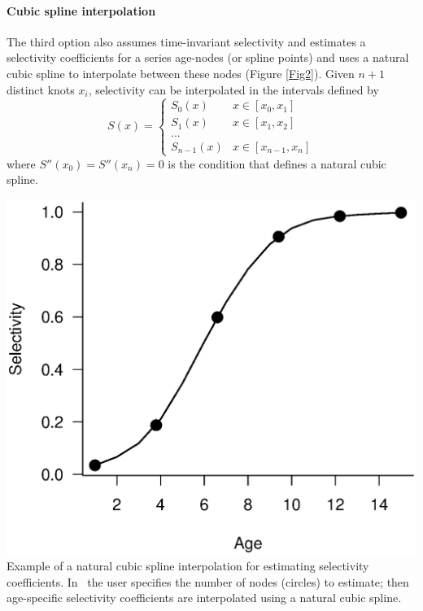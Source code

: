 \begin{multicols}{2}
\paragraph{Cubic spline interpolation}
The third option also assumes time-invariant selectivity and estimates a selectivity coefficients for a series age-nodes (or spline points) and uses a natural cubic spline to interpolate between these nodes (Figure \ref{Fig2}). Given $n+1$ distinct knots $x_i$, selectivity can be interpolated in the intervals defined by
\[
S(x) = \begin{cases}
    S_0(x) & x \in [x_0,x_1]\\
    S_1(x) & x \in [x_1,x_2]\\
    ...\\
    S_{n-1}(x) & x \in [x_{n-1},x_n]
\end{cases}
\]
where  $S''(x_0) = S''(x_n)=0$  is the condition that defines a natural cubic spline.
\begin{figurehere}
    \centering
    \includegraphics[width=\columnwidth]{iscamFigs/SplineEg.eps}\\
    \caption{Example of a natural cubic spline interpolation for estimating selectivity coefficients.  In \iscam\ the user specifies the number of nodes (circles) to estimate; then age-specific selectivity coefficients are interpolated using a natural cubic spline.}\label{Fig2}
\end{figurehere}


\end{multicols}
